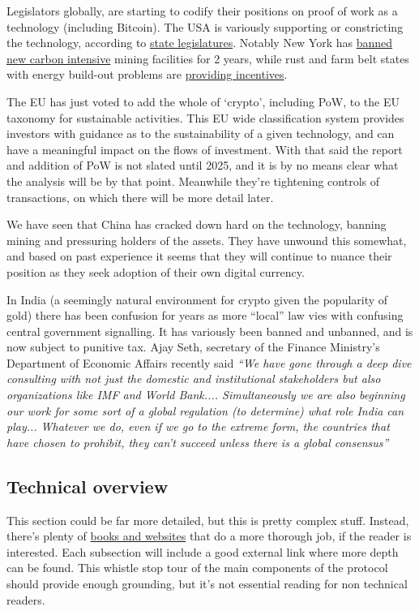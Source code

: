 Legislators globally, are starting to codify their positions on proof of work as a technology (including Bitcoin). The USA is variously supporting or constricting the technology, according to \href{https://www.ncsl.org/research/financial-services-and-commerce/cryptocurrency-2021-legislation.aspx}{state legislatures}. Notably New York has \href{https://www.nysenate.gov/legislation/bills/2021/A7389}{banned new carbon intensive} mining facilities for 2 years, while rust and farm belt states with energy build-out problems are \href{https://financialpost.com/fp-finance/cryptocurrency/texas-governor-abbott-turns-to-bitcoin-miners-to-bolster-the-grid-and-his-re-election}{providing incentives}. \par
The EU has just voted to add the whole of `crypto', including PoW, to the EU taxonomy for sustainable activities. This EU wide classification system provides investors with guidance as to the sustainability of a given technology, and can have a meaningful impact on the flows of investment. With that said the report and addition of PoW is not slated until 2025, and it is by no means clear what the analysis will be by that point. Meanwhile they're tightening controls of transactions, on which there will be more detail later.  \par
We have seen that China has cracked down hard on the technology, banning mining and pressuring holders of the assets. They have unwound this somewhat, and based on past experience it seems that they will continue to nuance their position as they seek adoption of their own digital currency.\par
In India (a seemingly natural environment for crypto given the popularity of gold) there has been confusion for years as more ``local'' law vies with confusing central government signalling. It has variously been banned and unbanned, and is now subject to punitive tax. Ajay Seth, secretary of the Finance Ministry's Department of Economic Affairs recently said \textit{``We have gone through a deep dive consulting with not just the domestic and institutional stakeholders but also organizations like IMF and World Bank.... Simultaneously we are also beginning our work for some sort of a global regulation (to determine) what role India can play... Whatever we do, even if we go to the extreme form, the countries that have chosen to prohibit, they can't succeed unless there is a global consensus''}
\subsection{Technical overview}
This section could be far more detailed, but this is pretty complex stuff. Instead, there's plenty of \href{https://github.com/bitcoinbook/bitcoinbook}{books and websites} that do a more thorough job, if the reader is interested. Each subsection will include a good external link where more depth can be found. This whistle stop tour of the main components of the protocol should provide enough grounding, but it's not essential reading for non technical readers.\par
